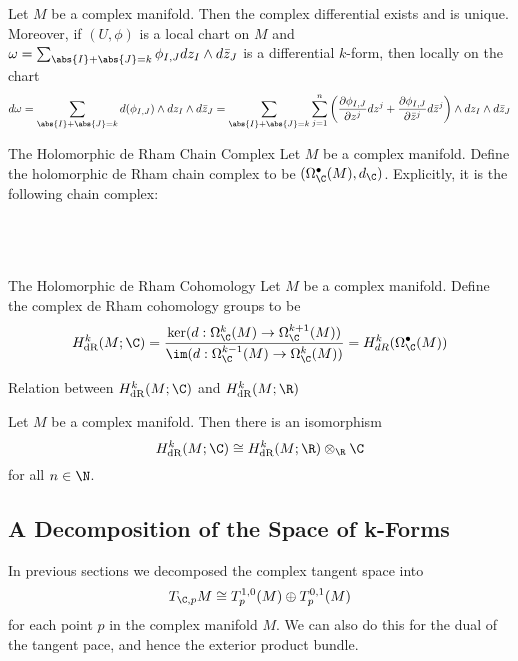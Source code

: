 \documentclass[a4paper]{article}
\begin{document}
\begin{prp}{}{} Let $M$ be a complex manifold. Then the complex differential exists and is unique. Moreover, if $(U,\phi)$ is a local chart on $M$ and $\omega=\sum_{\abs{I}+\abs{J}=k}\phi_{I,J}dz_I\wedge d\bar{z}_J$ is a differential $k$-form, then locally on the chart $$d\omega=\sum_{\abs{I}+\abs{J}=k}d(\phi_{I,J})\wedge dz_I\wedge d\bar{z}_J=\sum_{\abs{I}+\abs{J}=k}\sum_{j=1}^n\left(\frac{\partial\phi_{I,J}}{\partial z^j}dz^j+\frac{\partial\phi_{I,J}}{\partial\bar{z}^j}d\bar{z}^j\right)\wedge dz_I\wedge d\bar{z}_J$$
\end{prp}

\begin{defn}{The Holomorphic de Rham Chain Complex}{} Let $M$ be a complex manifold. Define the holomorphic de Rham chain complex to be $(\Omega_\C^\bullet(M),d_\C)$. Explicitly, it is the following chain complex: \\~\\
\\~\\
\end{defn}

\begin{defn}{The Holomorphic de Rham Cohomology}{} Let $M$ be a complex manifold. Define the complex de Rham cohomology groups to be $$H_{\text{dR}}^k(M;\C)=\frac{\ker(d:\Omega_{\C}^k(M)\to\Omega_{\C}^{k+1}(M))}{\im(d:\Omega_{\C}^{k-1}(M)\to\Omega_{\C}^k(M))}=H_{dR}^k(\Omega_{\C}^\bullet(M))$$
\end{defn}

Relation between $H_\text{dR}^k(M;\C)$ and $H_\text{dR}^k(M;\R)$

\begin{prp}{}{} Let $M$ be a complex manifold. Then there is an isomorphism $$H_{\text{dR}}^k(M;\C)\cong H_{\text{dR}}^k(M;\R)\otimes_\R\C$$ for all $n\in\N$. 
\end{prp}

\subsection{A Decomposition of the Space of k-Forms}
In previous sections we decomposed the complex tangent space into $$T_{\C,p}M\cong T_p^{1,0}(M)\oplus T_p^{0,1}(M)$$ for each point $p$ in the complex manifold $M$. We can also do this for the dual of the tangent pace, and hence the exterior product bundle. 
\end{document}
